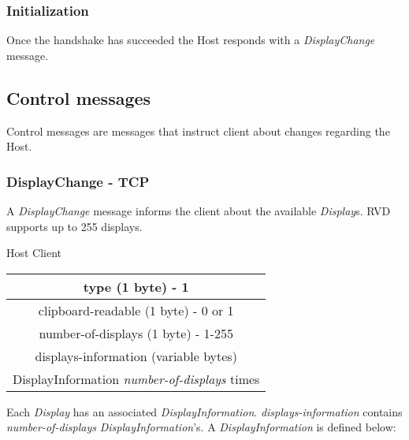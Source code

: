 \documentclass{article}
\begin{document}
    \subsubsection{Initialization}

    Once the handshake has succeeded the Host responds with a \emph{DisplayChange} message.

    \subsection{Control messages}
    Control messages are messages that instruct client about changes regarding the Host.

    \subsubsection{DisplayChange - TCP}
    A \emph{DisplayChange} message informs the client about the available \emph{Display}s. RVD supports up to 255 displays.

    \begin{center}
        Host \textrightarrow Client\\
        \begin{tabular}{|c|}
            \hline
            type (1 byte) - 1                                  \\
            \hline
            clipboard-readable (1 byte) - 0 or 1               \\
            \hline
            number-of-displays (1 byte) - 1-255                \\
            \hline
            displays-information (variable bytes)              \\
            \hline
            DisplayInformation \emph{number-of-displays} times \\
            \hline
        \end{tabular}
    \end{center}

    Each \emph{Display} has an associated \emph{DisplayInformation}. \emph{displays-information} contains \emph{number-of-displays} \emph{DisplayInformation}'s. A \emph{DisplayInformation} is defined below:
\end{document}
